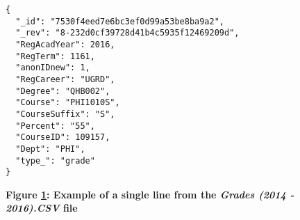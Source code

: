 \begin{figure}[H]
  \centering
  \begin{mdframed}
    \centering
    \begin{verbatim}
{
  "_id": "7530f4eed7e6bc3ef0d99a53be8ba9a2",
  "_rev": "8-232d0cf39728d41b4c5935f12469209d",
  "RegAcadYear": 2016,
  "RegTerm": 1161,
  "anonIDnew": 1,
  "RegCareer": "UGRD",
  "Degree": "QHB002",
  "Course": "PHI1010S",
  "CourseSuffix": "S",
  "Percent": "55",
  "CourseID": 109157,
  "Dept": "PHI",
  "type_": "grade"
}    
        \end{verbatim}
  \end{mdframed}
  \caption[Grade Document JSON Sample]{\textbf{Figure \ref{fig-json-grade}: Example of a single line from the \textit{Grades (2014 - 2016).CSV} file}}
  \label{fig-json-grade}
\end{figure}